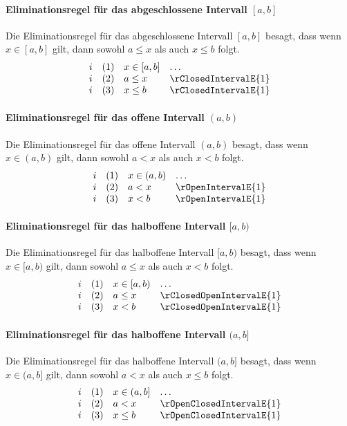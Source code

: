 \documentclass{book}
\theoremstyle{plain}
\theoremstyle{remark}
\theoremstyle{definition}
\begin{document}
\paragraph{Eliminationsregel für das abgeschlossene Intervall \([a, b]\)}
Die Eliminationsregel für das abgeschlossene Intervall \([a, b]\) besagt, dass wenn \(x \in [a, b]\) gilt, dann sowohl \(a \leq x\) als auch \(x \leq b\) folgt.
\[
\begin{array}{llll}
    i & (1) & x \in [a, b] & \dots \\
    i & (2) & a \leq x & \rClosedIntervalE{1} \\
    i & (3) & x \leq b & \rClosedIntervalE{1}
\end{array}
\]

\paragraph{Eliminationsregel für das offene Intervall \((a, b)\)}
Die Eliminationsregel für das offene Intervall \((a, b)\) besagt, dass wenn \(x \in (a, b)\) gilt, dann sowohl \(a < x\) als auch \(x < b\) folgt.
\[
\begin{array}{llll}
    i & (1) & x \in (a, b) & \dots \\
    i & (2) & a < x & \rOpenIntervalE{1} \\
    i & (3) & x < b & \rOpenIntervalE{1}
\end{array}
\]

\paragraph{Eliminationsregel für das halboffene Intervall \([a, b)\)}
Die Eliminationsregel für das halboffene Intervall \([a, b)\) besagt, dass wenn \(x \in [a, b)\) gilt, dann sowohl \(a \leq x\) als auch \(x < b\) folgt.
\[
\begin{array}{llll}
    i & (1) & x \in [a, b) & \dots \\
    i & (2) & a \leq x & \rClosedOpenIntervalE{1} \\
    i & (3) & x < b & \rClosedOpenIntervalE{1}
\end{array}
\]

\paragraph{Eliminationsregel für das halboffene Intervall \((a, b]\)}
Die Eliminationsregel für das halboffene Intervall \((a, b]\) besagt, dass wenn \(x \in (a, b]\) gilt, dann sowohl \(a < x\) als auch \(x \leq b\) folgt.
\[
\begin{array}{llll}
    i & (1) & x \in (a, b] & \dots \\
    i & (2) & a < x & \rOpenClosedIntervalE{1} \\
    i & (3) & x \leq b & \rOpenClosedIntervalE{1}
\end{array}
\]
\end{document}
